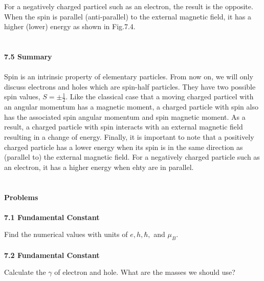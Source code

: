 \documentclass{article}
\begin{document}
For a negatively charged particel such as an electron, the result is
the opposite. When the spin is parallel (anti-parallel) to the external magnetic
field, it has a higher (lower) energy as shown in Fig.7.4.\\\\\\
\textbf{\large 7.5 Summary}\\\\
Spin is an intrinsic property of elementary particles. From now on, we will only discuss
electrons and holes which are spin-half particles. They have two possible spin values,
$S=\pm \frac{1}{2}$. Like the classical  case that a moving charged particel with 
an angular momentum has a magnetic moment, a charged particle with spin also
has the associated spin angular momentum and spin magnetic moment. As a result,
a charged particle with spin interacts with an external magnetic field resulting in a
change of energy. Finally, it is important to note that a positively charged particle has a
lower energy when its spin is in the same direction as (parallel to) the external
magnetic field. For a negatively charged particle such as an electron, it has a higher energy when
ehty are in parallel.\\\\\\
\textbf{\large Problems}\\\\
\textbf{7.1 Fundamental Constant}

Find the numerical values with units of $e,h,\hbar,$ and $\mu_B$.\\\\
\textbf{7.2 Fundamental Constant}

Calculate the $\gamma$ of electron and hole. What are the masses we should use?
\end{document}
